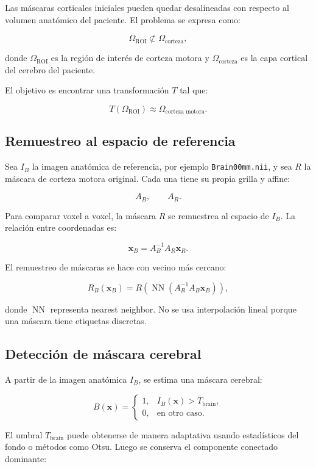 \documentclass[12pt,a4paper]{article}
\begin{document}
Las máscaras corticales iniciales pueden quedar desalineadas con respecto al volumen anatómico del paciente. El problema se expresa como:

\[
\Omega_{\text{ROI}} \not\subset \Omega_{\text{corteza}},
\]

donde \(\Omega_{\text{ROI}}\) es la región de interés de corteza motora y \(\Omega_{\text{corteza}}\) es la capa cortical del cerebro del paciente.

El objetivo es encontrar una transformación \(T\) tal que:

\[
T(\Omega_{\text{ROI}})\approx \Omega_{\text{corteza motora}}.
\]

\subsection{Remuestreo al espacio de referencia}

Sea \(I_B\) la imagen anatómica de referencia, por ejemplo \texttt{Brain00mm.nii}, y sea \(R\) la máscara de corteza motora original. Cada una tiene su propia grilla y affine:

\[
A_B,\qquad A_R.
\]

Para comparar voxel a voxel, la máscara \(R\) se remuestrea al espacio de \(I_B\). La relación entre coordenadas es:

\[
\mathbf{x}_B =
A_B^{-1}A_R\mathbf{x}_R.
\]

El remuestreo de máscaras se hace con vecino más cercano:

\[
R_B(\mathbf{x}_B)
=
R\left(
\operatorname{NN}
\left(A_R^{-1}A_B\mathbf{x}_B\right)
\right),
\]

donde \(\operatorname{NN}\) representa nearest neighbor. No se usa interpolación lineal porque una máscara tiene etiquetas discretas.

\subsection{Detección de máscara cerebral}

A partir de la imagen anatómica \(I_B\), se estima una máscara cerebral:

\[
B(\mathbf{x}) =
\begin{cases}
1, & I_B(\mathbf{x}) > T_{\text{brain}},\\
0, & \text{en otro caso}.
\end{cases}
\]

El umbral \(T_{\text{brain}}\) puede obtenerse de manera adaptativa usando estadísticos del fondo o métodos como Otsu. Luego se conserva el componente conectado dominante:
\end{document}
